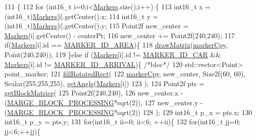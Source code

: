 \begin{DoxyCode}
111                                                \{
112     \textcolor{keywordflow}{for} (int16\_t i=0;i<\hyperlink{classImagesP_ac2813bc8a3edac420df686902806172c}{Markers}.size();i++) \{
113         int16\_t x = (int16\_t)\hyperlink{classImagesP_ac2813bc8a3edac420df686902806172c}{Markers}[i].getCenter().x;
114         int16\_t y = (int16\_t)\hyperlink{classImagesP_ac2813bc8a3edac420df686902806172c}{Markers}[i].getCenter().y;
115         Point2f new\_center = \hyperlink{classImagesP_ac2813bc8a3edac420df686902806172c}{Markers}[i].getCenter() - centerPt;
116         new\_center += Point2f(240,240);
117         \textcolor{keywordflow}{if}(\hyperlink{classImagesP_ac2813bc8a3edac420df686902806172c}{Markers}[i].\textcolor{keywordtype}{id} == \hyperlink{definition_8h_a6036f5d317ce1f843aae2fdd46d845c9}{MARKER\_ID\_AREA})\{
118             \hyperlink{classImagesP_a4eee68c40eb47b29e0b738ea38a55353}{drawMatrix}(\hyperlink{classImagesP_adc6b2ffa6cbfab6c1b83ed4bef74f1b9}{markerCpy}, Point(240,240));
119         \}\textcolor{keywordflow}{else} \textcolor{keywordflow}{if} (\hyperlink{classImagesP_ac2813bc8a3edac420df686902806172c}{Markers}[i].\textcolor{keywordtype}{id} != \hyperlink{definition_8h_aa0e4cfe3919e1b2633bd67fbbae28ec5}{MARKER\_ID\_CAR} && \hyperlink{classImagesP_ac2813bc8a3edac420df686902806172c}{Markers}[i].\textcolor{keywordtype}{id} != 
      \hyperlink{definition_8h_a6b35f14504af015e91cc6963cb51d6f5}{MARKER\_ID\_ARRIVAL})\{ \textcolor{comment}{/*bloc*/}
120             std::vector<Point> point\_marker;
121             \hyperlink{classImagesP_aab5950c25ea44c06bc4026ce6dece7fa}{fillRotatedRect}(
122                 \hyperlink{classImagesP_adc6b2ffa6cbfab6c1b83ed4bef74f1b9}{markerCpy}, new\_center, Size2f(60, 60), Scalar(255,255,255), 
      \hyperlink{classImagesP_a03b81fad0317e9939085c5e7538c2efe}{getAngle}(\hyperlink{classImagesP_ac2813bc8a3edac420df686902806172c}{Markers}[i])
123             );
124             Point2f pts = \hyperlink{classImagesP_a9e709b963a13bc9dff823815e5e66200}{getBlockMatrice}(
125                 Point2f(240,240), 
126                 new\_center.x - (\hyperlink{definition_8h_a7ff61b468299d760aa0a3187ab24dddc}{MARGE\_BLOCK\_PROCESSING}*sqrt(2)), 
127                 new\_center.y - (\hyperlink{definition_8h_a7ff61b468299d760aa0a3187ab24dddc}{MARGE\_BLOCK\_PROCESSING}*sqrt(2))
128             );
129             int16\_t p\_x = pts.x;
130             int16\_t p\_y = pts.y;
131             \textcolor{keywordflow}{for}(int16\_t ii=0; ii<6; ++ii)\{
132                 \textcolor{keywordflow}{for}(int16\_t jj=0; jj<6;++jj)\{

\end{DoxyCode}

